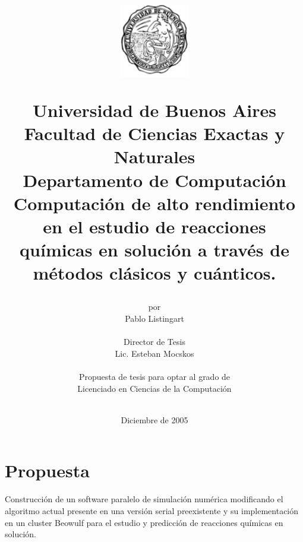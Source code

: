 \documentclass[a4paper, 12pt]{article}
\begin{document}

\title {
\begin{figure}[h]
\begin{center}
\includegraphics[keepaspectratio, width=3cm]{escudo}
\end{center}
\end{figure}
Universidad de Buenos Aires\\
Facultad de Ciencias Exactas y Naturales\\
Departamento de Computaci\'on\\
\vspace{10mm}
\Huge\textbf{Computaci\'on de alto rendimiento en el estudio de reacciones qu\'imicas en soluci\'on
a trav\'es de m\'etodos cl\'asicos y cu\'anticos.}
\vspace{10mm}
}

\author{por \\
    Pablo Listingart\\
        \\
        Director de Tesis\\
        Lic. Esteban Mocskos\\
        \\
        Propuesta de tesis para optar al grado de \\
        Licenciado en Ciencias de la Computaci\'on\\
        \\
        }
\date{Diciembre de 2005}

\maketitle

\pagebreak

\section*{Propuesta}

Construcci\'on de un software paralelo de simulaci\'on num\'erica modificando el algoritmo actual presente en una versi\'on serial preexistente y su implementaci\'on en un cluster Beowulf para el estudio y predicci\'on de reacciones qu\'imicas en soluci\'on.
\end{document}
